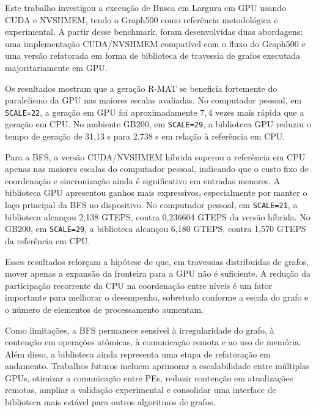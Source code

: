 Este trabalho investigou a execução de Busca em Largura em GPU usando CUDA e
NVSHMEM, tendo o Graph500 como referência metodológica e experimental. A partir
desse benchmark, foram desenvolvidas duas abordagens: uma implementação
CUDA/NVSHMEM compatível com o fluxo do Graph500 e uma versão refatorada em forma
de biblioteca de travessia de grafos executada majoritariamente em GPU.

Os resultados mostram que a geração R-MAT se beneficia fortemente do paralelismo
da GPU nas maiores escalas avaliadas. No computador pessoal, em
\texttt{SCALE=22}, a geração em GPU foi aproximadamente $7{,}4$ vezes mais
rápida que a geração em CPU. No ambiente GB200, em \texttt{SCALE=29}, a biblioteca
GPU reduziu o tempo de geração de 31,13 s para 2,738 s em relação à referência em
CPU.

Para a BFS, a versão CUDA/NVSHMEM híbrida superou a referência em CPU apenas nas
maiores escalas do computador pessoal, indicando que o custo fixo de coordenação
e sincronização ainda é significativo em entradas menores. A biblioteca GPU
apresentou ganhos mais expressivos, especialmente por manter o laço principal da
BFS no dispositivo. No computador pessoal, em \texttt{SCALE=21}, a biblioteca
alcançou 2,138 GTEPS, contra 0,236604 GTEPS da versão híbrida. No GB200, em
\texttt{SCALE=29}, a biblioteca alcançou 6,180 GTEPS, contra 1,570 GTEPS da
referência em CPU.

Esses resultados reforçam a hipótese de que, em travessias distribuídas de
grafos, mover apenas a expansão da fronteira para a GPU não é suficiente. A
redução da participação recorrente da CPU na coordenação entre níveis é um fator
importante para melhorar o desempenho, sobretudo conforme a escala do grafo e o
número de elementos de processamento aumentam.

Como limitações, a BFS permanece sensível à irregularidade do grafo, à contenção
em operações atômicas, à comunicação remota e ao uso de memória. Além disso, a
biblioteca ainda representa uma etapa de refatoração em andamento. Trabalhos
futuros incluem aprimorar a escalabilidade entre múltiplas GPUs, otimizar a
comunicação entre PEs, reduzir contenção em atualizações remotas, ampliar a
validação experimental e consolidar uma interface de biblioteca mais estável para
outros algoritmos de grafos.
